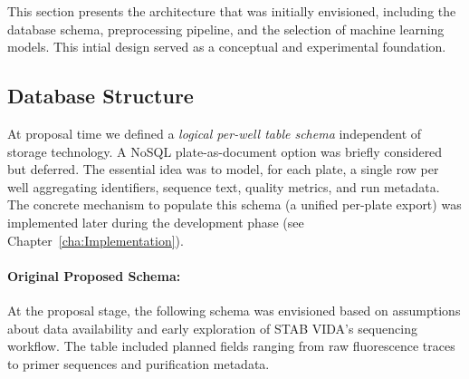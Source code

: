 This section presents the architecture that was initially envisioned, including the database schema, preprocessing pipeline, and the selection of machine learning models. This intial design served as a conceptual and experimental foundation.


\subsection{Database Structure}

At proposal time we defined a \emph{logical per-well table schema} independent of storage technology. A NoSQL plate-as-document option was briefly considered but deferred. The essential idea was to model, for each plate, a single row per well aggregating identifiers, sequence text, quality metrics, and run metadata. The concrete mechanism to populate this schema (a unified per-plate export) was implemented later during the development phase (see Chapter~\ref{cha:Implementation}).

\paragraph{Original Proposed Schema:}  
At the proposal stage, the following schema was envisioned based on assumptions about data availability and early exploration of STAB VIDA’s sequencing workflow. The table included planned fields ranging from raw fluorescence traces to primer sequences and purification metadata.

